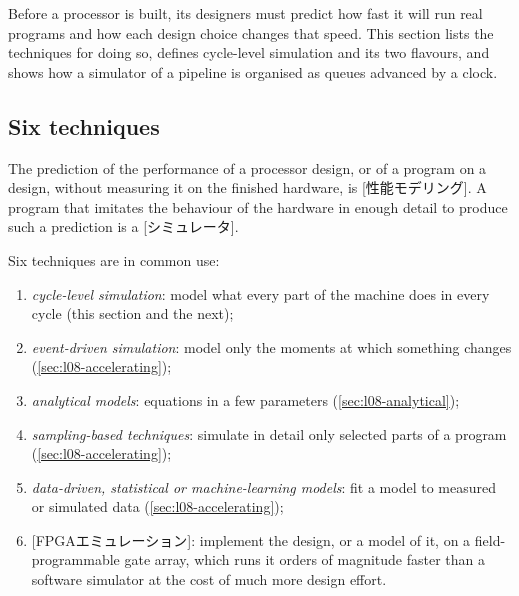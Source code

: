 \documentclass[../main.tex]{subfiles}
\begin{document}
Before a processor is built, its designers must predict how fast it
will run real programs and how each design choice changes that
speed.  This section lists the
techniques for doing so, defines cycle-level simulation and its two
flavours, and shows how a simulator of a pipeline is organised as
queues advanced by a clock.

\subsection{Six techniques}

\begin{definition}
  \label{def:l08-performance-modeling}
  The prediction of the performance of a processor design, or of a
  program on a design, without measuring it on the finished hardware,
  is [性能モデリング].  A program that
  imitates the behaviour of the hardware in enough detail to produce
  such a prediction is a [シミュレータ].
\end{definition}

Six techniques are in common use:
\begin{enumerate}
  \item \emph{cycle-level simulation}: model what every part of the
    machine does in every cycle (this section and the next);
  \item \emph{event-driven simulation}: model only the moments at which
    something changes (\cref{sec:l08-accelerating});
  \item \emph{analytical models}: equations in a few parameters
    (\cref{sec:l08-analytical});
  \item \emph{sampling-based techniques}: simulate in detail only
    selected parts of a program (\cref{sec:l08-accelerating});
  \item \emph{data-driven, statistical or machine-learning models}:
    fit a model to measured or simulated data
    (\cref{sec:l08-accelerating});
  \item {}[FPGAエミュレーション]: implement the
    design, or a model of it, on a field-programmable gate array, which
    runs it orders of magnitude faster than a software simulator at the
    cost of much more design effort.
\end{enumerate}
\end{document}

